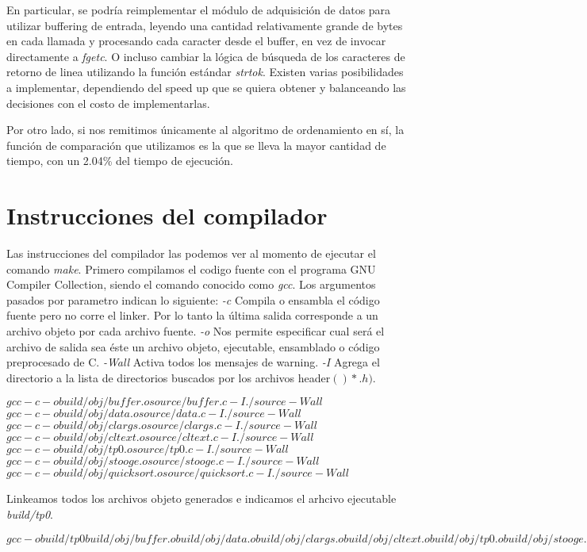 \documentclass[a4paper,11pt]{article}
\begin{document}
En particular, se podría reimplementar el módulo de adquisición de datos para
utilizar buffering de entrada, leyendo una cantidad relativamente grande de
bytes en cada llamada y procesando cada caracter desde el buffer, en vez de
invocar directamente a \textit{fgetc}. O incluso cambiar la lógica de búsqueda
de los caracteres de retorno de linea utilizando la función estándar
\textit{strtok}. Existen varias posibilidades a implementar, dependiendo del
speed up que se quiera obtener y balanceando las decisiones con el costo de
implementarlas.

Por otro lado, si nos remitimos únicamente al algoritmo de ordenamiento en sí,
la función de comparación que utilizamos es la que se lleva la mayor cantidad
de tiempo, con un 2.04\% del tiempo de ejecución.

\section{Instrucciones del compilador}

Las instrucciones del compilador las podemos ver al momento de ejecutar el
comando \textit{make}.
Primero compilamos el codigo fuente con el programa GNU Compiler Collection,
siendo el comando conocido como \textit{gcc}. Los argumentos pasados por
parametro indican lo siguiente:
\textit{-c} Compila o ensambla el código fuente pero no corre el linker.
Por lo tanto la última salida corresponde a un archivo objeto por cada archivo
fuente.
\textit{-o} Nos permite especificar cual será el archivo de salida sea éste un
archivo objeto, ejecutable, ensamblado o código preprocesado de C.
\textit{-Wall} Activa todos los mensajes de warning.
\textit{-I} Agrega el directorio a la lista de directorios buscados por los 
archivos header\(()*.h)\).

\(gcc -c -o build/obj/buffer.o source/buffer.c -I./source -Wall\)
\(gcc -c -o build/obj/data.o source/data.c -I./source -Wall\)
\(gcc -c -o build/obj/clargs.o source/clargs.c -I./source -Wall\)
\(gcc -c -o build/obj/cltext.o source/cltext.c -I./source -Wall\)
\(gcc -c -o build/obj/tp0.o source/tp0.c -I./source -Wall\)
\(gcc -c -o build/obj/stooge.o source/stooge.c -I./source -Wall\)
\(gcc -c -o build/obj/quicksort.o source/quicksort.c -I./source -Wall\)

Linkeamos todos los archivos objeto generados e indicamos el arhcivo ejecutable
\textit{build/tp0}.

\(gcc -o build/tp0 build/obj/buffer.o build/obj/data.o build/obj/clargs.o build/obj/cltext.o build/obj/tp0.o build/obj/stooge.o build/obj/quicksort.o -I./source -Wall\)
\end{document}
